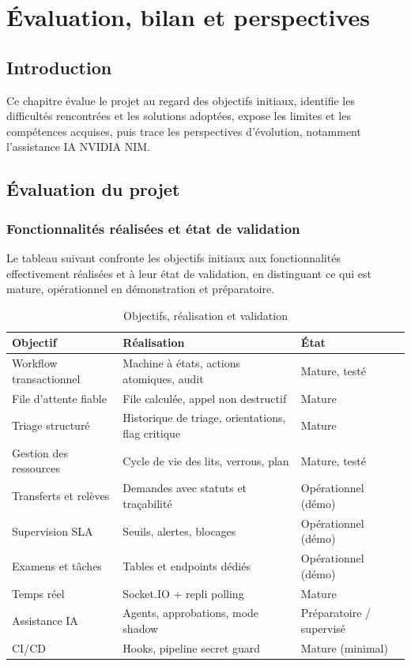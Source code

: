 \chapter{Évaluation, bilan et perspectives}

\section{Introduction}

Ce chapitre évalue le projet au regard des objectifs initiaux, identifie les difficultés rencontrées et les solutions adoptées, expose les limites et les compétences acquises, puis trace les perspectives d'évolution, notamment l'assistance IA NVIDIA NIM.

\section{Évaluation du projet}

\subsection{Fonctionnalités réalisées et état de validation}

Le tableau suivant confronte les objectifs initiaux aux fonctionnalités effectivement réalisées et à leur état de validation, en distinguant ce qui est mature, opérationnel en démonstration et préparatoire.

\begin{table}[H]
\centering
\caption{Objectifs, réalisation et validation}
\label{tab:evaluation}
\small
\begin{tabular}{|p{4.2cm}|p{5.4cm}|p{4cm}|}
\hline
\textbf{Objectif} & \textbf{Réalisation} & \textbf{État} \\
\hline
Workflow transactionnel & Machine à états, actions atomiques, audit & Mature, testé \\
\hline
File d'attente fiable & File calculée, appel non destructif & Mature \\
\hline
Triage structuré & Historique de triage, orientations, flag critique & Mature \\
\hline
Gestion des ressources & Cycle de vie des lits, verrous, plan & Mature, testé \\
\hline
Transferts et relèves & Demandes avec statuts et traçabilité & Opérationnel (démo) \\
\hline
Supervision SLA & Seuils, alertes, blocages & Opérationnel (démo) \\
\hline
Examens et tâches & Tables et endpoints dédiés & Opérationnel (démo) \\
\hline
Temps réel & Socket.IO + repli polling & Mature \\
\hline
Assistance IA & Agents, approbations, mode shadow & Préparatoire / supervisé \\
\hline
CI/CD & Hooks, pipeline secret guard & Mature (minimal) \\
\hline
\end{tabular}
\end{table}

